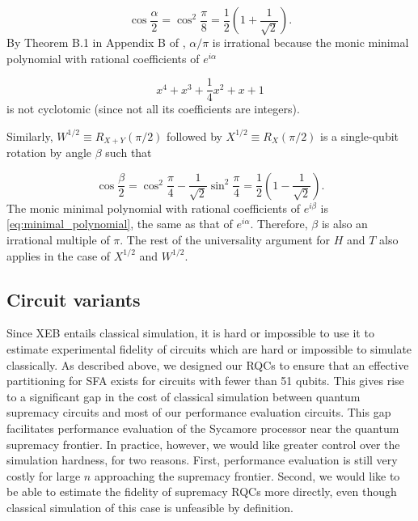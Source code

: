 \begin{equation}
\cos\frac{\alpha}{2} = \cos^2\frac{\pi}{8} = \frac{1}{2}\left(1 + \frac{1}{\sqrt{2}}\right).
\end{equation}
By Theorem B.1 in Appendix B of \cite{Boykin1999OnUniversal}, $\alpha/\pi$ is irrational because the monic minimal polynomial with rational coefficients of $e^{i\alpha}$

\begin{equation}\label{eq:minimal_polynomial}
x^4 + x^3 + \frac{1}{4}x^2 + x + 1
\end{equation}
is not cyclotomic (since not all its coefficients are integers).

Similarly, $W^{1/2} \equiv R_{X+Y}(\pi / 2)$ followed by $X^{1/2} \equiv R_X(\pi / 2)$ is a single-qubit rotation by angle $\beta$ such that

\begin{equation}
\cos\frac{\beta}{2} = \cos^2\frac{\pi}{4} - \frac{1}{\sqrt{2}}\sin^2\frac{\pi}{4} = \frac{1}{2}\left(1 - \frac{1}{\sqrt{2}}\right).
\end{equation}
The monic minimal polynomial with rational coefficients of $e^{i\beta}$ is \eqref{eq:minimal_polynomial}, the same as that of $e^{i\alpha}$. Therefore, $\beta$ is also an irrational multiple of $\pi$. The rest of the universality argument for $H$ and $T$ also applies in the case of $X^{1/2}$ and $W^{1/2}$.

\subsection{Circuit variants}
\label{sec:circuit_variants}
Since XEB entails classical simulation, it is hard or impossible to use it to estimate experimental fidelity of circuits which are hard or impossible to simulate classically. As described above, we designed our RQCs to ensure that an effective partitioning for SFA exists for circuits with fewer than 51 qubits. This gives rise to a significant gap in the cost of classical simulation between quantum supremacy circuits and most of our performance evaluation circuits. This gap facilitates performance evaluation of the Sycamore processor near the quantum supremacy frontier. In practice, however, we would like greater control over the simulation hardness, for two reasons. First, performance evaluation is still very costly for large $n$ approaching the supremacy frontier. Second, we would like to be able to estimate the fidelity of supremacy RQCs more directly, even though classical simulation of this case is unfeasible by definition.

